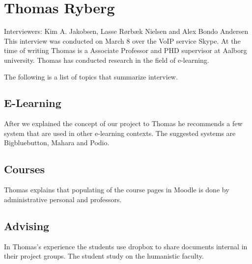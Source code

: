 \section{Thomas Ryberg}
\label{sec:thomas}
Interviewers: Kim A. Jakobsen, Lasse Rørbæk Nielsen and Alex Bondo Andersen\\

This interview was conducted on March 8\ths{} over the VoIP service Skype.
At the time of writing Thomas is a Associate Professor and PHD supervisor at Aalborg university.
Thomas has conducted research in the field of e-learning.

The following is a list of topics that summarize interview.

\subsection*{E-Learning}
After we explained the concept of our project to Thomas he recommends a few system that are used in other e-learning contexts.
The suggested systems are Bigbluebutton, Mahara and Podio.


\subsection*{Courses}
Thomas explains that populating of the course pages in Moodle is done by administrative personal and professors.


\subsection*{Advising}
In Thomas's experience the students use dropbox to share documents internal in their project groups. The student study on the humanistic faculty.  